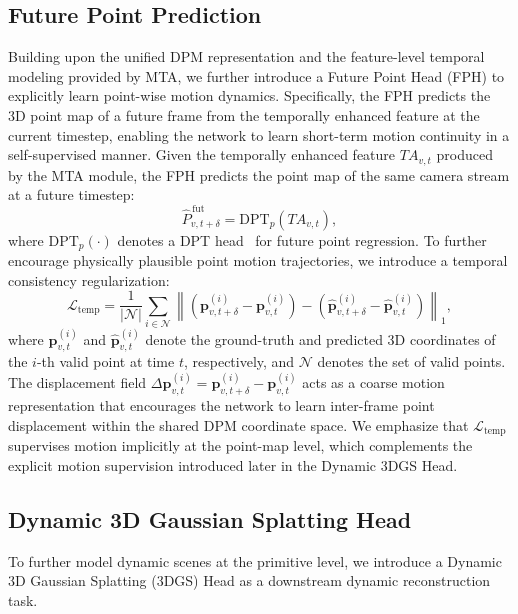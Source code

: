 \subsection{Future Point Prediction}

Building upon the unified DPM representation and the feature-level temporal modeling provided by MTA, 
we further introduce a Future Point Head (FPH) to explicitly learn point-wise motion dynamics. 
Specifically, the FPH predicts the 3D point map of a future frame from the temporally enhanced feature at the current timestep, enabling the network to learn short-term motion continuity in a self-supervised manner.
Given the temporally enhanced feature $TA_{v,t}$ produced by the MTA module, the FPH predicts the point map of the same camera stream at a future timestep:
\begin{equation}
\hat{P}_{v,t+\delta}^{\,\mathrm{fut}} = \mathrm{DPT}_{p}(TA_{v,t}),
\end{equation}
where $\mathrm{DPT}_{p}(\cdot)$ denotes a DPT head~\cite{ranftl2021vision} for future point regression.
To further encourage physically plausible point motion trajectories, we introduce a temporal consistency regularization:
\begin{equation}
\mathcal{L}_{\mathrm{temp}}=
\frac{1}{|\mathcal{N}|}\sum_{i\in \mathcal{N}}
\left\|
\left(\mathbf{p}_{v,t+\delta}^{(i)}-\mathbf{p}_{v,t}^{(i)}\right)
-
\left(\hat{\mathbf{p}}_{v,t+\delta}^{(i)}-\hat{\mathbf{p}}_{v,t}^{(i)}\right)
\right\|_{1},
\label{eq:temporal_consistency}
\end{equation}
where $\mathbf{p}_{v,t}^{(i)}$ and $\hat{\mathbf{p}}_{v,t}^{(i)}$ denote the ground-truth and predicted 3D coordinates of the $i$-th valid point at time $t$, respectively, and $\mathcal{N}$ denotes the set of valid points.
The displacement field
$
\Delta \mathbf{p}_{v,t}^{(i)} = \mathbf{p}_{v,t+\delta}^{(i)}-\mathbf{p}_{v,t}^{(i)}
$
acts as a coarse motion representation that encourages the network to learn inter-frame point displacement within the shared DPM coordinate space. 
We emphasize that $\mathcal{L}_{\mathrm{temp}}$ supervises motion implicitly at the point-map level, which complements the explicit motion supervision introduced later in the Dynamic 3DGS Head.

\subsection{Dynamic 3D Gaussian Splatting Head}

To further model dynamic scenes at the primitive level, we introduce a Dynamic 3D Gaussian Splatting (3DGS) Head as a downstream dynamic reconstruction task.

